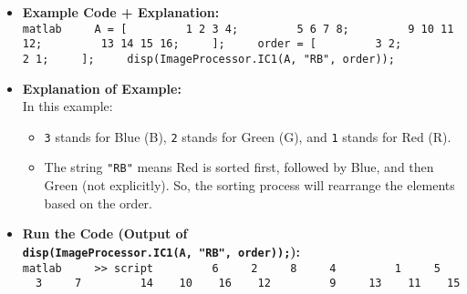 \documentclass[11pt]{amsart}
\theoremstyle{remark}
\providecommand{\tightlist}{%
  \setlength{\itemsep}{0pt}\setlength{\parskip}{0pt}}
\theoremstyle{definition}
\theoremstyle{remark}
\numberwithin{equation}{section}
\begin{document}
\begin{itemize}
\begin{verbatim}
[data, rows, cols] = ImageProcessor.customSorting(order,"rc",[1 3 2]);
disp(cols + "," + rows);
\end{verbatim}

  \begin{enumerate}
  \def\labelenumi{\arabic{enumi}.}
  \setcounter{enumi}{3}
  \item
    \textbf{Sorted Output Example:}\\
    If the \texttt{order} is \texttt{{[}3\ 2;\ 2\ 1{]}} (2D matrix) and
    the 3rd parameter of the \texttt{customSorting} function is
    \texttt{{[}1\ 3\ 2{]}} (meaning ``R \textless{} B \textless{} G''),
    the output looks like this:

\begin{verbatim}
>> script
   "2,2"    "1,2"
   "1,1"    "2,1"

Sorted order:
     1     2
     3     2
\end{verbatim}

    The \texttt{IC1} function uses these row and column indices to apply
    the sorting to the matrix \texttt{A}.
  \end{enumerate}
\item
  \textbf{Example Code + Explanation:}
  \texttt{matlab\ \ \ \ \ A\ =\ {[}\ \ \ \ \ \ \ \ \ 1\ 2\ 3\ 4;\ \ \ \ \ \ \ \ \ 5\ 6\ 7\ 8;\ \ \ \ \ \ \ \ \ 9\ 10\ 11\ 12;\ \ \ \ \ \ \ \ \ 13\ 14\ 15\ 16;\ \ \ \ \ {]};\ \ \ \ \ order\ =\ {[}\ \ \ \ \ \ \ \ \ 3\ 2;\ \ \ \ \ \ \ \ \ 2\ 1;\ \ \ \ \ {]};\ \ \ \ \ disp(ImageProcessor.IC1(A,\ "RB",\ order));}
\item
  \textbf{Explanation of Example:}\\
  In this example:

  \begin{itemize}
  \tightlist
  \item
    \texttt{3} stands for Blue (B), \texttt{2} stands for Green (G), and
    \texttt{1} stands for Red (R).\\
  \item
    The string \texttt{"RB"} means Red is sorted first, followed by
    Blue, and then Green (not explicitly). So, the sorting process will
    rearrange the elements based on the order.
  \end{itemize}
\item
  \textbf{Run the Code (Output of
  \texttt{disp(ImageProcessor.IC1(A,\ "RB",\ order));}):}
  \texttt{matlab\ \ \ \ \ \textgreater{}\textgreater{}\ script\ \ \ \ \ \ \ \ \ 6\ \ \ \ \ 2\ \ \ \ \ 8\ \ \ \ \ 4\ \ \ \ \ \ \ \ \ 1\ \ \ \ \ 5\ \ \ \ \ 3\ \ \ \ \ 7\ \ \ \ \ \ \ \ \ 14\ \ \ \ 10\ \ \ \ 16\ \ \ \ 12\ \ \ \ \ \ \ \ \ 9\ \ \ \ \ 13\ \ \ \ 11\ \ \ \ 15}
\end{itemize}
\end{document}
